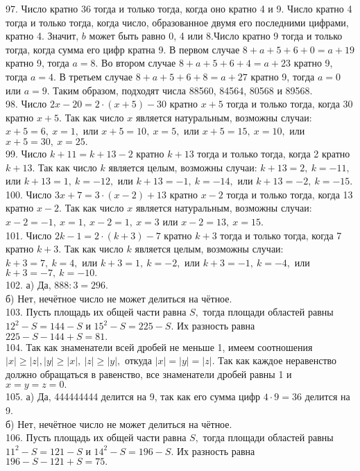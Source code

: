 97. Число кратно 36 тогда и только тогда, когда оно кратно 4 и 9. Число кратно 4 тогда и только тогда, когда число, образованное двумя его последними цифрами, кратно 4. Значит, $b$ может быть равно 0, 4 или 8.Число кратно 9 тогда и только тогда, когда сумма его цифр кратна 9. В первом случае $8+a+5+6+0=a+19$ кратно 9, тогда $a=8.$ Во втором случае $8+a+5+6+4=a+23$ кратно 9, тогда $a=4.$ В третьем случае $8+a+5+6+8=a+27$ кратно 9, тогда $a=0$ или $a=9.$ Таким образом, подходят числа 88560, 84564, 80568 и 89568.\\
98. Число $2x-20=2\cdot(x+5)-30$ кратно $x+5$ тогда и только тогда, когда 30 кратно $x+5.$ Так как число $x$ является натуральным, возможны случаи: $x+5=6,\ x=1,$ или $x+5=10,\ x=5,$ или $x+5=15,\ x=10,$ или $x+5=30,\ x=25.$\\
99. Число $k+11=k+13-2$ кратно $k+13$ тогда и только тогда, когда 2 кратно $k+13.$ Так как число $k$ является целым, возможны случаи: $k+13=2,\ k=-11,$ или $k+13=1,\ k=-12,$ или $k+13=-1,\ k=-14,$ или $k+13=-2,\ k=-15.$\\
100. Число $3x+7=3\cdot(x-2)+13$ кратно $x-2$ тогда и только тогда, когда 13 кратно $x-2.$ Так как число $x$ является натуральным, возможны случаи: $x-2=-1,\ x=1,\ x-2=1,\ x=3$ или $x-2=13,\ x=15.$\\
101. Число $2k-1=2\cdot(k+3)-7$ кратно $k+3$ тогда и только тогда, когда 7 кратно $k+3.$ Так как число $k$ является целым, возможны случаи: $k+3=7,\ k=4,$ или $k+3=1,\ k=-2,$ или $k+3=-1,\ k=-4,$ или $k+3=-7,\ k=-10.$\\
102. а) Да, $888:3=296.$\\
б) Нет, нечётное число не может делиться на чётное.\\
103. Пусть площадь их общей части равна $S,$ тогда площади областей равны $12^2-S=144-S$ и $15^2-S=225-S.$ Их разность равна $225-S-144+S=81.$\\
104. Так как знаменатели всей дробей не меньше 1, имеем соотношения $|x|\geqslant |z|, |y|\geqslant |x|,\ |z|\geqslant |y|,$ откуда
$|x|=|y|=|z|.$ Так как каждое неравенство должно обращаться в равенство, все знаменатели дробей равны 1 и $x=y=z=0.$\\
105. а) Да, 444444444 делится на 9, так как его сумма цифр $4\cdot9=36$ делится на 9.\\
б) Нет, нечётное число не может делиться на чётное.\\
106. Пусть площадь их общей части равна $S,$ тогда площади областей равны $11^2-S=121-S$ и $14^2-S=196-S.$ Их разность равна $196-S-121+S=75.$\\
